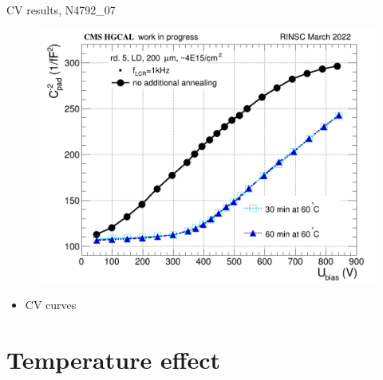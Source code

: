 \documentclass{beamer}
\begin{document}
\begin{frame}{CV results, N4792\_07}
  \begin{figure}
      \includegraphics[width=.7\textwidth]{plots/annealing_CV_ch101_N4792_7.png}    
  \end{figure}
  \begin{itemize}
    \item CV curves
  \end{itemize}
\end{frame}



\section{Temperature effect}
\end{document}
